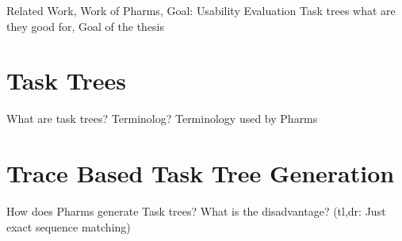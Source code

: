 Related Work, Work of Pharms, Goal: Usability Evaluation \citep{harms2013}
Task trees what are they good for, Goal of the thesis
\section{Task Trees}
What are task trees? Terminolog? Terminology used by Pharms
\section{Trace Based Task Tree Generation}
How does Pharms generate Task trees? What is the disadvantage? (tl,dr: Just exact sequence matching)


